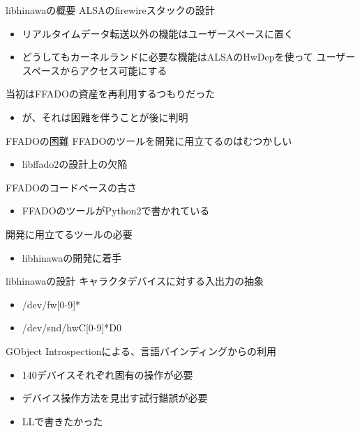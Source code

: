 \begin{frame}{libhinawaの概要}
  ALSAのfirewireスタックの設計
  \begin{itemize}
  \item リアルタイムデータ転送以外の機能はユーザースペースに置く
  \item どうしてもカーネルランドに必要な機能はALSAのHwDepを使って
        ユーザースペースからアクセス可能にする
  \end{itemize}
  当初はFFADOの資産を再利用するつもりだった
  \begin{itemize}
  \item が、それは困難を伴うことが後に判明
  \end{itemize}
\end{frame}

\begin{frame}{FFADOの困難}
  FFADOのツールを開発に用立てるのはむつかしい
  \begin{itemize}
  \item libffado2の設計上の欠陥
  \end{itemize}
  FFADOのコードベースの古さ
  \begin{itemize}
  \item FFADOのツールがPython2で書かれている
  \end{itemize}
  開発に用立てるツールの必要
  \begin{itemize}
  \item libhinawaの開発に着手
  \end{itemize}
\end{frame}

\begin{frame}{libhinawaの設計}
  キャラクタデバイスに対する入出力の抽象
  \begin{itemize}
  \item /dev/fw[0-9]*
  \item /dev/snd/hwC[0-9]*D0
  \end{itemize}
  GObject Introspectionによる、言語バインディングからの利用
  \begin{itemize}
  \item 140デバイスそれぞれ固有の操作が必要
  \item デバイス操作方法を見出す試行錯誤が必要
  \item LLで書きたかった
  \end{itemize}
\end{frame}

